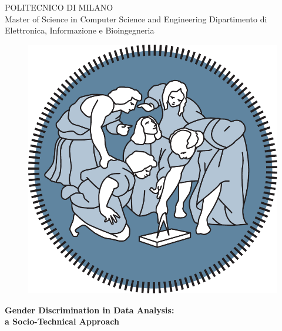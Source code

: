 \thispagestyle{empty}
\vspace*{-1.5cm}

\bfseries{
\begin{center}

\large
POLITECNICO DI MILANO\\
\normalsize
Master of Science in Computer Science and Engineering
Dipartimento di Elettronica, Informazione e Bioingegneria

 
\vspace{5mm}


\begin{figure}[h]
\begin{center}
\includegraphics[scale=.275]{logo_polimi.pdf}
\end{center}
\end{figure}

\vspace{1cm}
\LARGE
\textbf{Gender Discrimination in Data Analysis:\\a Socio-Technical Approach}\\



\end{center}}
